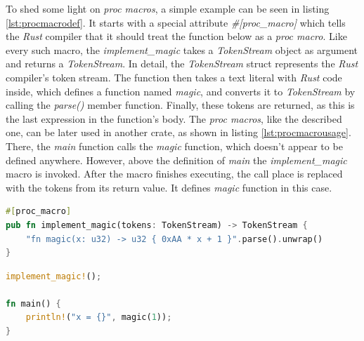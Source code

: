To shed some light on \textit{proc macros}, a simple example can be seen in listing \ref{lst:procmacrodef}. It starts with a special attribute \textit{\#[proc\_macro]} which tells the \textit{Rust} compiler that it should treat the function below as a \textit{proc macro}. Like every such macro, the \textit{implement\_magic} takes a \textit{TokenStream} object as argument and returns a \textit{TokenStream}. In detail, the \textit{TokenStream} struct represents the \textit{Rust} compiler's token stream. The function then takes a text literal with \textit{Rust} code inside, which defines a function named \textit{magic}, and converts it to \textit{TokenStream} by calling the \textit{parse()} member function. Finally, these tokens are returned, as this is the last expression in the function's body. The \textit{proc macros}, like the described one, can be later used in another crate, as shown in listing \ref{lst:procmacrousage}. There, the \textit{main} function calls the \textit{magic} function, which doesn't appear to be defined anywhere. However, above the definition of \textit{main} the \textit{implement\_magic} macro is invoked. After the macro finishes executing, the call place is replaced with the tokens from its return value. It defines \textit{magic} function in this case.

\begin{minipage}{\linewidth}
\begin{lstlisting}[language=rust,caption={Example of a \textit{proc macro} definition.},label={lst:procmacrodef}]
#[proc_macro]
pub fn implement_magic(tokens: TokenStream) -> TokenStream {
    "fn magic(x: u32) -> u32 { 0xAA * x + 1 }".parse().unwrap()
}
\end{lstlisting}
\end{minipage}

\begin{minipage}{\linewidth}
\begin{lstlisting}[language=rust,caption={Example usage of a \textit{proc macro}.},label={lst:procmacrousage}]
implement_magic!();

fn main() {
    println!("x = {}", magic(1));
}
\end{lstlisting}
\end{minipage}

